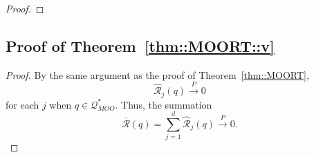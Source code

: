 \documentclass[aos, preprint]{imsart}
\theoremstyle{plain}
\theoremstyle{definition}
\let\hat\widehat
\begin{document}
\begin{appendix}
\begin{proof}
%
%
%
%
\end{proof}


\subsection{Proof of Theorem~\ref{thm::MOORT::v}}

\begin{proof}

By the same argument as the proof of Theorem~\ref{thm::MOORT},
$$
\hat{\mathcal{R}}_j(q)\overset{P}{\rightarrow} 0
$$
for each $j$ when $q\in  \mathcal{Q}^*_{MOO}$.
Thus, the summation 
$$
\bar{\mathcal{R}}(q) = \sum_{j=1}^d \hat{\mathcal{R}}_j(q) \overset{P}{\rightarrow}0 .
$$

\end{proof}



\end{appendix}
\end{document}
